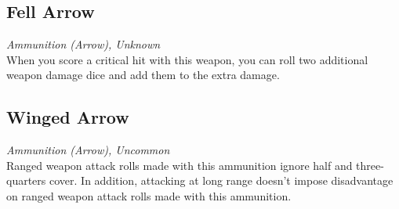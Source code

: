 \documentclass[letterpaper,openany,oneside,twocolumn]{book}
\begin{document}
\subsection*{Fell Arrow}
\textit{Ammunition (Arrow), Unknown}\\
When you score a critical hit with this weapon, you can roll two additional weapon damage dice and add them to the extra damage.
\subsection*{Winged Arrow}
\textit{Ammunition (Arrow), Uncommon}\\
Ranged weapon attack rolls made with this ammunition ignore half and three-quarters cover. In addition, attacking at long range doesn't impose disadvantage on ranged weapon attack rolls made with this ammunition.
\end{document}
